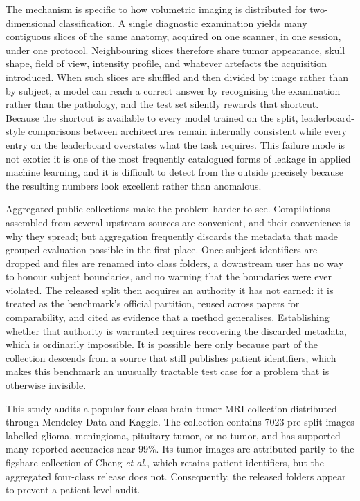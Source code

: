 ﻿\documentclass[11pt]{article}
\begin{document}
The mechanism is specific to how volumetric imaging is distributed for two-dimensional classification. A single diagnostic examination yields many contiguous slices of the same anatomy, acquired on one scanner, in one session, under one protocol. Neighbouring slices therefore share tumor appearance, skull shape, field of view, intensity profile, and whatever artefacts the acquisition introduced. When such slices are shuffled and then divided by image rather than by subject, a model can reach a correct answer by recognising the examination rather than the pathology, and the test set silently rewards that shortcut. Because the shortcut is available to every model trained on the split, leaderboard-style comparisons between architectures remain internally consistent while every entry on the leaderboard overstates what the task requires. This failure mode is not exotic: it is one of the most frequently catalogued forms of leakage in applied machine learning\cite{kapoor2023leakage}, and it is difficult to detect from the outside precisely because the resulting numbers look excellent rather than anomalous.

Aggregated public collections make the problem harder to see. Compilations assembled from several upstream sources are convenient, and their convenience is why they spread; but aggregation frequently discards the metadata that made grouped evaluation possible in the first place. Once subject identifiers are dropped and files are renamed into class folders, a downstream user has no way to honour subject boundaries, and no warning that the boundaries were ever violated. The released split then acquires an authority it has not earned: it is treated as the benchmark's official partition, reused across papers for comparability, and cited as evidence that a method generalises. Establishing whether that authority is warranted requires recovering the discarded metadata, which is ordinarily impossible. It is possible here only because part of the collection descends from a source that still publishes patient identifiers, which makes this benchmark an unusually tractable test case for a problem that is otherwise invisible.

This study audits a popular four-class brain tumor MRI collection distributed through Mendeley Data and Kaggle\cite{ghaffar2024dataset,nickparvar2021dataset}. The collection contains 7023 pre-split images labelled glioma, meningioma, pituitary tumor, or no tumor, and has supported many reported accuracies near 99\%. Its tumor images are attributed partly to the figshare collection of Cheng \textit{et al.}\cite{cheng2015enhanced}, which retains patient identifiers, but the aggregated four-class release does not. Consequently, the released folders appear to prevent a patient-level audit.
\end{document}
